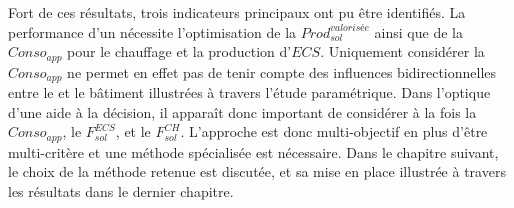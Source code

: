 Fort de ces résultats, trois indicateurs principaux ont pu être identifiés. La performance
d’un  nécessite l’optimisation de la $Prod_{sol}^{valorisée}$ ainsi que de la
$Conso_{app}$ pour le chauffage et la production d’$ECS$. Uniquement considérer la
$Conso_{app}$ ne permet en effet pas de tenir compte des influences bidirectionnelles
entre le  et le bâtiment illustrées à travers l’étude paramétrique. Dans l’optique
d’une aide à la décision, il apparaît donc important de considérer à la fois la
$Conso_{app}$, le $F_{sol}^{ECS}$, et le $F_{sol}^{CH}$. L’approche est donc multi-objectif en plus
d’être multi-critère et une méthode spécialisée est nécessaire. Dans le chapitre suivant,
le choix de la méthode retenue est discutée, et sa mise en place illustrée à travers les
résultats dans le dernier chapitre.

